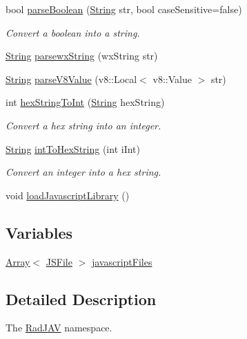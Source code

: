 \begin{DoxyCompactItemize}
bool \mbox{\hyperlink{namespace_rad_j_a_v_aeadea788704996c8d0d8352c434ba1c6}{parse\+Boolean}} (\mbox{\hyperlink{class_rad_j_a_v_1_1_string}{String}} str, bool case\+Sensitive=false)
\begin{DoxyCompactList}\small\item\em Convert a boolean into a string. \end{DoxyCompactList}\item 
\mbox{\hyperlink{class_rad_j_a_v_1_1_string}{String}} \mbox{\hyperlink{namespace_rad_j_a_v_a6c77eaa06c1cacff5e3eca5569e587a3}{parsewx\+String}} (wx\+String str)
\item 
\mbox{\hyperlink{class_rad_j_a_v_1_1_string}{String}} \mbox{\hyperlink{namespace_rad_j_a_v_a08d7731efefd73097db75edfda8f0b8e}{parse\+V8\+Value}} (v8\+::\+Local$<$ v8\+::\+Value $>$ str)
\item 
int \mbox{\hyperlink{namespace_rad_j_a_v_a55e36aeb12f245adf1ce6d66c606aff3}{hex\+String\+To\+Int}} (\mbox{\hyperlink{class_rad_j_a_v_1_1_string}{String}} hex\+String)
\begin{DoxyCompactList}\small\item\em Convert a hex string into an integer. \end{DoxyCompactList}\item 
\mbox{\hyperlink{class_rad_j_a_v_1_1_string}{String}} \mbox{\hyperlink{namespace_rad_j_a_v_a5d863b29fa911427399686369688928a}{int\+To\+Hex\+String}} (int i\+Int)
\begin{DoxyCompactList}\small\item\em Convert an integer into a hex string. \end{DoxyCompactList}\item 
void \mbox{\hyperlink{namespace_rad_j_a_v_abdc80a52e8c285baa202205c347233ca}{load\+Javascript\+Library}} ()
\end{DoxyCompactItemize}
\subsection*{Variables}
\begin{DoxyCompactItemize}
\item 
\mbox{\hyperlink{class_rad_j_a_v_1_1_array}{Array}}$<$ \mbox{\hyperlink{class_rad_j_a_v_1_1_j_s_file}{J\+S\+File}} $>$ \mbox{\hyperlink{namespace_rad_j_a_v_ad238af21ba8714838d7368dfc40c1112}{javascript\+Files}}
\end{DoxyCompactItemize}


\subsection{Detailed Description}
The \mbox{\hyperlink{namespace_rad_j_a_v}{Rad\+J\+AV}} namespace. 

